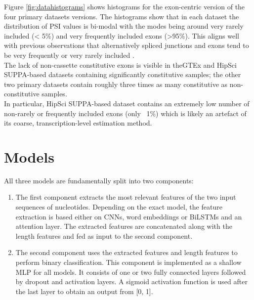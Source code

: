 Figure \ref{fig:datahistograms} shows histograms for the exon-centric version of the four primary datasets versions. The histograms show that in each dataset the distribution of PSI values is bi-modal with the modes being around very rarely included (< 5\%) and very frequently included exons (>95\%). This aligns well with previous observations that alternatively spliced junctions and exons tend to be very frequently or very rarely included \cite{buschhertel} \cite{bimodalpsivalues1} \cite{bimodalpsivalues2}.\\
The lack of non-cassette constitutive exons is visible in theGTEx and HipSci SUPPA-based datasets containing significantly constitutive samples; the other two primary datasets contain roughly three times as many constitutive as non-constitutive samples. \\
In particular, HipSci SUPPA-based dataset contains an extremely low number of non-rarely or frequently included exons (only ~1\%) which is likely an artefact of its coarse, transcription-level estimation method.

\section{Models} \label{sec:models}
All three models are fundamentally split into two components: 
\begin{enumerate}
	\item The first component extracts the most relevant features of the two input sequences of nucleotides.  Depending on the exact model, the feature extraction is based either on CNNs, word embeddings or BiLSTMs and an attention layer. The extracted features are concatenated along with the length features and fed as input to the second component. 
	
	\item The second component uses the extracted features and length features to perform binary classification. This component is implemented as a shallow MLP for all models. It consists of one or two fully connected layers followed by dropout and activation layers. A sigmoid activation function is used after the last layer to obtain an output from [0, 1].
\end{enumerate}

